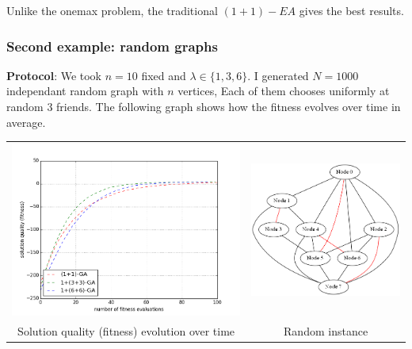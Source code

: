\documentclass{article}
\begin{document}
Unlike the onemax problem, the traditional $(1+1)-EA$ gives the best results.

\subsubsection{Second example: random graphs}
\textbf{Protocol}: We took $n=10$ fixed and $\lambda \in \{1, 3, 6\}$. I generated $N=1000$ independant random graph with $n$ vertices, Each of them chooses uniformly at random 3 friends. The following graph shows how the fitness evolves over time in average.


\begin{tabular}{cc} 
	\includegraphics[scale=0.5]{img/random_graph_stat.png} & \includegraphics[scale=0.4]{img/random_graph_matching.png} \\
	Solution quality (fitness) evolution over time & Random instance
\end{tabular}
\end{document}
